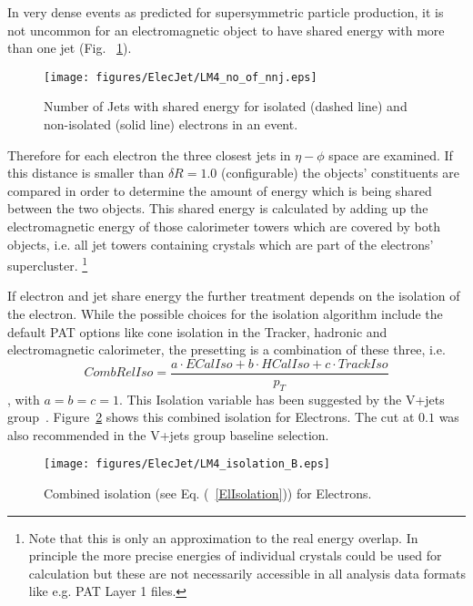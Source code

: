 \documentclass{cmspaper}
\begin{document}
In very dense events as predicted for supersymmetric particle production, it is
not uncommon for an electromagnetic object to have shared energy with more than
one jet (Fig. ~\ref{fig:NbJets}).

\begin{figure}[hbtp]
  \begin{center}
    \texttt{[image: figures/ElecJet/LM4\_no\_of\_nnj.eps]}
    \caption{Number of Jets with shared energy for isolated (dashed line) and
    non-isolated (solid line) electrons in an event.}
    \label{fig:NbJets}
  \end{center}
\end{figure}

Therefore for each electron the three closest jets in \( \eta-\phi\) space are
examined. If this distance is smaller than $\delta R=1.0$ (configurable) the
objects' constituents are compared in order to determine the amount of energy
which is being shared between the two objects.
This shared energy is calculated by adding up the electromagnetic energy of
those calorimeter towers which are covered by both objects, i.e. all jet towers
containing crystals which are part of the electrons' supercluster.
\footnote{Note that this is only an approximation to the real energy overlap.
In principle the more precise energies of individual crystals could be used for
calculation but these are not necessarily accessible in all analysis data
formats like e.g. PAT Layer 1 files.}

If electron and jet share energy the further treatment depends on the isolation
of the electron. While the possible choices for the isolation algorithm include
the default PAT options like cone isolation in the Tracker, hadronic and
electromagnetic calorimeter, the presetting is a combination of these three,
i.e. 
\begin{equation}
    CombRelIso=\frac{a\cdot ECalIso+b\cdot HCalIso+c\cdot TrackIso}{p_T}
    \label{ElIsolation}
\end{equation}
, with \(a=b=c=1\). This Isolation variable has been suggested by the V+jets
group~\cite{vplusjets}. Figure~\ref{fig:ElectronIsolation} shows this combined
isolation for Electrons. The cut at \(0.1\) was also recommended in the V+jets
group baseline selection.

\begin{figure}[hbtp]
  \begin{center}
    \texttt{[image: figures/ElecJet/LM4\_isolation\_B.eps]}
    \caption{Combined isolation (see Eq. (~\ref{ElIsolation})) for Electrons.}
    \label{fig:ElectronIsolation}
  \end{center}
\end{figure}
\end{document}

